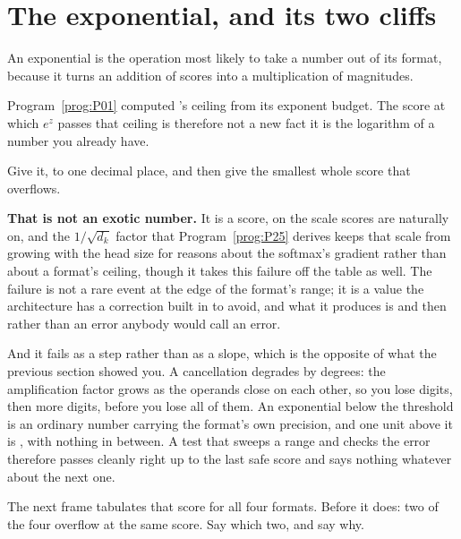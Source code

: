 \section{The exponential, and its two cliffs}
\label{sec:P02-cliffs}

\begin{fr}
An exponential is the operation most likely to take a number out of its
format, because it turns an addition of scores into a multiplication of
magnitudes.

Program~\ref{prog:P01} computed 's ceiling from its exponent budget.
The score at which $e^{z}$ passes that ceiling is therefore not a new fact
\dash{} it is the logarithm of a number you already have.

Give it, to one decimal place, and then give the smallest whole score that
overflows.
\nextframe
\end{fr}

\begin{fr}

\textbf{That is not an exotic number.} It is a score, on the scale scores are
naturally on, and the $1/\sqrt{d_k}$ factor that Program~\ref{prog:P25}
derives keeps that scale from growing with the head size \dash{} for reasons
about the softmax's gradient rather than about a format's ceiling, though it
takes this failure off the table as well.
The failure is not a rare event at the edge of the format's range; it is a
value the architecture has a correction built in to avoid, and what it produces
is  and then  rather than an error anybody would call an
error.

And it fails as a step rather than as a slope, which is the opposite of what
the previous section showed you. A cancellation degrades by degrees: the
amplification factor grows as the operands close on each other, so you lose
digits, then more digits, before you lose all of them. An exponential below the
threshold is an ordinary number carrying the format's own precision, and one
unit above it is
, with nothing in between. A test that sweeps a range and checks the
error therefore passes cleanly right up to the last safe score and says nothing
whatever about the next one.

The next frame tabulates that score for all four formats. Before it does: two
of the four overflow at the same score. Say which two, and say why.
\dotline
\nextframe
\end{fr}

